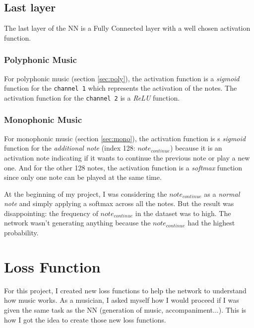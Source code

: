 \documentclass[12pt]{report}
\begin{document}
\subsection{Last layer}

The last layer of the NN is a Fully Connected layer with a well chosen activation function.

\subsubsection{Polyphonic Music}

For polyphonic music (section \ref{sec:poly}), the activation function is a \textit{sigmoid} function for the \texttt{channel 1} which represents the activation of the notes.
The activation function for the \texttt{channel 2} is a \textit{ReLU} function.

\subsubsection{Monophonic Music}
\label{sec:last-layer-mono}

For monophonic music (section \ref{sec:mono}), the activation function is s \textit{sigmoid} function for the \textit{additional note} (index 128: $note_{continue}$) because it is an activation note indicating if it wants to continue the previous note or play a new one. And for the other 128 notes, the activation function is a \textit{softmax} function since only one note can be played at the same time.

At the beginning of my project, I was considering the $note_{continue}$ as a \textit{normal note} and simply applying a softmax across all the notes.
But the result was disappointing: the frequency of $note_{continue}$ in the dataset was to high.
The network wasn't generating anything because the $note_{continue}$ had the highest probability.


\section{Loss Function}
\label{sec:loss}

For this project, I created new loss functions to help the network to understand how music works.
As a musician, I asked myself how I would proceed if I was given the same task as the NN (generation of music, accompaniment...).
This is how I got the idea to create those new loss functions.
\end{document}
